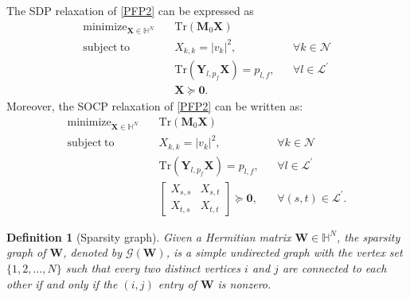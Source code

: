\documentclass[journal,twoside]{IEEEtran}
\newtheorem{definition}{Definition}
\newcommand{\Tr}{\mathrm{Tr}}
\newcommand{\st}{\mathrm{subject~to}}
\newcommand{\bM}{\mathbf{M}}
\newcommand{\bW}{\mathbf{W}}
\newcommand{\bX}{\mathbf{X}}
\newcommand{\cL}{{\mathcal L}}
\newcommand{\cM}{{\mathcal M}}
\newcommand{\cN}{{\mathcal N}}
\DeclareMathOperator*{\mini}{\mathrm{minimize}}
\begin{document}
The SDP relaxation of \eqref{PFP2} can be expressed as
\begin{subequations}\label{PF-SDPP-specM}
	\begin{align}
	\mini_{\bX \in\mathbb{H}^{N}}\quad &\Tr(\bM_0\bX) \label{PF-SDPP-specM:obj}\\
	\st\quad  &X_{k,k} = |v_k|^2, &&\forall k\in \cN \label{PF-SDPP-specM:meq_Node} \\
			  &\mathrm{Tr}(\mathbf{Y}_{l,p_f}\mathbf{X})=p_{l,f}, &&\forall l\in  \cL^{\prime}
			  \label{PF-SDPP-specM:meq_Branch}\\
			  &\mathbf{X}\succeq \mathbf{0}.
	\end{align}
\end{subequations}
Moreover, the SOCP relaxation of \eqref{PFP2} can be written as:
\begin{subequations}\label{PF-SOCP-specM}
	\begin{align}
	\mini_{\bX \in\mathbb{H}^{N}}\quad &\Tr(\bM_0\bX)\label{PF-SOCP-specM:obj}\\
	\st\quad  &X_{k,k} = |v_k|^2, &&\forall k\in \cN  \label{PF-SOCP-specM:meq_Node}\\
	&\mathrm{Tr}(\mathbf{Y}_{l,p_f}\mathbf{X})=p_{l,f}, &&\forall l\in \cL^{\prime}\label{PF-SOCP-specM:meq_Branch}\\
	\quad &
	\begin{bmatrix}
	X_{s,s} & X_{s,t}\\
	X_{t,s} &X_{t,t}
	\end{bmatrix}
	\succeq  \mathbf{0}, &&\forall(s,t) \in \cL^{\prime}.\label{PF-SOCP-specM:cone}
	\end{align}
\end{subequations}


\begin{definition}[Sparsity graph]
Given a Hermitian matrix $\mathbf{W}\in\mathbb H^N$,
the sparsity graph of $\mathbf{W}$, denoted by $\mathscr{G}(\bW)$, is a simple undirected graph with the vertex set  $\{1,2,\ldots,N\}$ such that every two distinct vertices $i$ and $j$ are connected to each other  if  and only if the $(i,j)$ entry of $\mathbf{W}$ is nonzero.
\end{definition}
\end{document}
